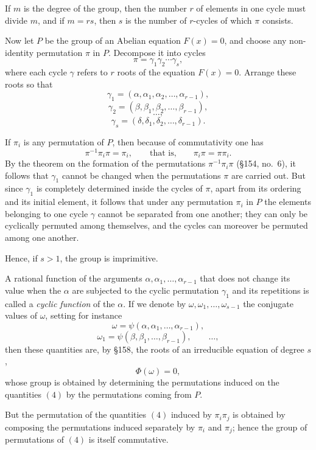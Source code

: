\documentclass[11pt]{article}
\begin{document}
\medskip
If $m$ is the degree of the group, then the number $r$ of elements in one cycle must divide $m$, and if $m = rs$, then $s$ is the number of $r$-cycles of which $\pi$ consists.

Now let $P$ be the group of an Abelian equation $F(x)=0$, and choose any non-identity permutation $\pi$ in $P$. Decompose it into cycles
\[
\pi = \gamma_1\gamma_2\cdots\gamma_s,
\tag{1}
\]
where each cycle $\gamma$ refers to $r$ roots of the equation $F(x)=0$. Arrange these roots so that
\[
\gamma_1=(\alpha,\alpha_1,\alpha_2,\dots,\alpha_{r-1}),
\]
\[
\gamma_2=(\beta,\beta_1,\beta_2,\dots,\beta_{r-1}),
\]
\[
\dots,
\]
\[
\gamma_s=(\delta,\delta_1,\delta_2,\dots,\delta_{r-1}).
\tag{2}
\]

If $\pi_i$ is any permutation of $P$, then because of commutativity one has
\[
\pi^{-1}\pi_i\pi=\pi_i,
\qquad\text{that is,}\qquad
\pi_i\pi=\pi\pi_i.
\tag{3}
\]
By the theorem on the formation of the permutations $\pi^{-1}\pi_i\pi$ (\S 154, no.\ 6), it follows that $\gamma_1$ cannot be changed when the permutations $\pi$ are carried out. But since $\gamma_1$ is completely determined inside the cycles of $\pi$, apart from its ordering and its initial element, it follows that under any permutation $\pi_i$ in $P$ the elements belonging to one cycle $\gamma$ cannot be separated from one another; they can only be cyclically permuted among themselves, and the cycles can moreover be permuted among one another.

Hence, if $s>1$, the group is imprimitive.

A rational function of the arguments $\alpha,\alpha_1,\dots,\alpha_{r-1}$ that does not change its value when the $\alpha$ are subjected to the cyclic permutation $\gamma_1$ and its repetitions is called a \emph{cyclic function} of the $\alpha$. If we denote by $\omega,\omega_1,\dots,\omega_{s-1}$ the conjugate values of $\omega$, setting for instance
\[
\omega=\psi(\alpha,\alpha_1,\dots,\alpha_{r-1}),
\]
\[
\omega_1=\psi(\beta,\beta_1,\dots,\beta_{r-1}),
\qquad\dots,
\tag{4}
\]
then these quantities are, by \S 158, the roots of an irreducible equation of degree $s$,
\[
\Phi(\omega)=0,
\tag{5}
\]
whose group is obtained by determining the permutations induced on the quantities \((4)\) by the permutations coming from $P$.

But the permutation of the quantities \((4)\) induced by $\pi_i\pi_j$ is obtained by composing the permutations induced separately by $\pi_i$ and $\pi_j$; hence the group of permutations of \((4)\) is itself commutative.
\end{document}
